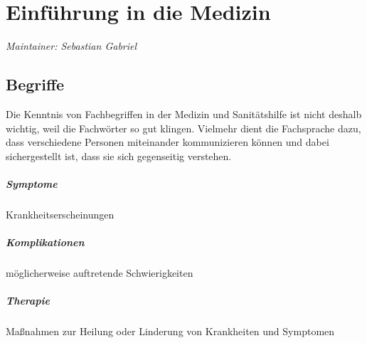 \chapter{Einführung in die Medizin}

\emph{Maintainer: Sebastian Gabriel}

\minitoc


% 

\section{Begriffe}

Die Kenntnis von Fachbegriffen in der Medizin und
Sanitätshilfe ist nicht deshalb wichtig, weil die Fachwörter
so gut klingen. Vielmehr dient die Fachsprache dazu, dass
verschiedene Personen miteinander kommunizieren können und
dabei sichergestellt ist, dass sie sich gegenseitig
verstehen.

\paragraph{Symptome}  Krankheitserscheinungen
\paragraph{Komplikationen} 
möglicherweise auftretende Schwierigkeiten
\paragraph{Therapie}  Ma{\ss}nahmen zur
Heilung oder Linderung von Krankheiten und Symptomen
